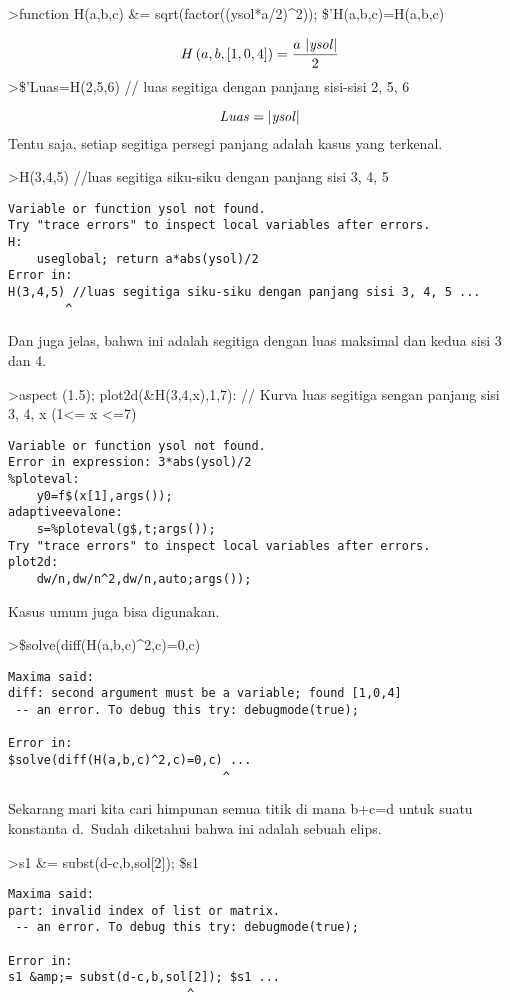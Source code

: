 \documentclass[
]{book}
\begin{document}
\textgreater function H(a,b,c) \&= sqrt(factor((ysol*a/2)\^{}2)); \$'H(a,b,c)=H(a,b,c)

\[H\left(a , b , \left[ 1 , 0 , 4 \right] \right)=\frac{a\,\left| 
 {\it ysol}\right| }{2}\]\textgreater\$'Luas=H(2,5,6) // luas segitiga dengan panjang sisi-sisi 2, 5, 6

\[{\it Luas}=\left| {\it ysol}\right| \]Tentu saja, setiap segitiga persegi panjang adalah kasus yang terkenal.

\textgreater H(3,4,5) //luas segitiga siku-siku dengan panjang sisi 3, 4, 5

\begin{verbatim}
Variable or function ysol not found.
Try "trace errors" to inspect local variables after errors.
H:
    useglobal; return a*abs(ysol)/2 
Error in:
H(3,4,5) //luas segitiga siku-siku dengan panjang sisi 3, 4, 5 ...
        ^
\end{verbatim}

Dan juga jelas, bahwa ini adalah segitiga dengan luas maksimal dan kedua sisi 3 dan 4.

\textgreater aspect (1.5); plot2d(\&H(3,4,x),1,7): // Kurva luas segitiga sengan panjang sisi 3, 4, x (1\textless= x \textless=7)

\begin{verbatim}
Variable or function ysol not found.
Error in expression: 3*abs(ysol)/2
%ploteval:
    y0=f$(x[1],args());
adaptiveevalone:
    s=%ploteval(g$,t;args());
Try "trace errors" to inspect local variables after errors.
plot2d:
    dw/n,dw/n^2,dw/n,auto;args());
\end{verbatim}

Kasus umum juga bisa digunakan.

\textgreater\$solve(diff(H(a,b,c)\^{}2,c)=0,c)

\begin{verbatim}
Maxima said:
diff: second argument must be a variable; found [1,0,4]
 -- an error. To debug this try: debugmode(true);

Error in:
$solve(diff(H(a,b,c)^2,c)=0,c) ...
                              ^
\end{verbatim}

Sekarang mari kita cari himpunan semua titik di mana b+c=d untuk suatu konstanta d.~Sudah diketahui bahwa ini adalah sebuah elips.

\textgreater s1 \&= subst(d-c,b,sol{[}2{]}); \$s1

\begin{verbatim}
Maxima said:
part: invalid index of list or matrix.
 -- an error. To debug this try: debugmode(true);

Error in:
s1 &amp;= subst(d-c,b,sol[2]); $s1 ...
                         ^
\end{verbatim}
\end{document}

